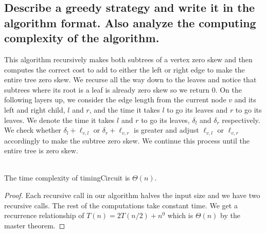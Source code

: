\documentclass[11pt]{scrartcl}
\begin{document}
\subsection{
	Describe a greedy strategy and write it in the algorithm format. Also
	analyze the computing complexity of the algorithm.
}
This algorithm recursively makes both subtrees of a vertex zero skew and then 
computes the correct cost to add to either the left or right edge to make the 
entire tree zero skew. We recurse all the way down to the leaves and notice that 
subtrees where its root is a leaf is already zero skew so we return $0$. 
On the following layers up, we consider the edge length from the current node $v$ and 
its left and right child, $l$ and $r$, and the time it takes $l$ to go its leaves and
$r$ to go its leaves. We denote the time it takes $l$ and $r$ to go its leaves, $\delta_l$
and $\delta_r$ respectively. We check whether $\delta_l + \ell_{v,l}$ or $\delta_r + \ell_{v,r}$
is greater and adjust $\ell_{v,l}$ or $\ell_{v,r}$ accordingly to make the subtree zero skew. 
We continue this process until the entire tree is zero skew. 
\begin{algorithm}
\end{algorithm}\-\\
The time complexity of timingCircuit is $\Theta(n)$.
\begin{proof}
	Each recursive call in our algorithm halves the input size and we have two 
	recursive calls. The rest of the computations take constant time.  
	We get a recurrence relationship of $T(n) = 2T(n/2) + n^0$ 
	which is $\Theta(n)$ by the master theorem.
\end{proof}
\end{document}
